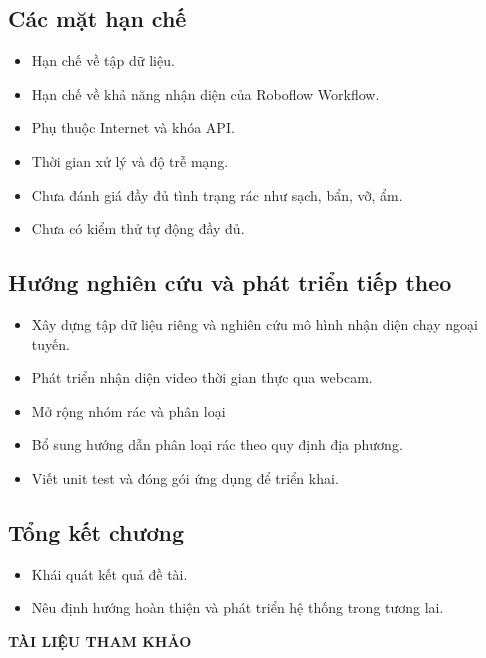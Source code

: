 \documentclass[a4paper,13pt]{extarticle}
\begin{document}
\subsection {Các mặt hạn chế}
\begin{itemize}
    \item Hạn chế về tập dữ liệu.
    \item Hạn chế về khả năng nhận diện của Roboflow Workflow.
    \item Phụ thuộc Internet và khóa API.
    \item Thời gian xử lý và độ trễ mạng.
    \item Chưa đánh giá đầy đủ tình trạng rác như sạch, bẩn, vỡ, ẩm.
    \item Chưa có kiểm thử tự động đầy đủ.
\end{itemize}

\subsection{ Hướng nghiên cứu và phát triển tiếp theo}
\begin{itemize}
    \item Xây dựng tập dữ liệu riêng và nghiên cứu mô hình nhận diện chạy ngoại tuyến.
    \item Phát triển nhận diện video thời gian thực qua webcam.
    \item Mở rộng nhóm rác và phân loại
    \item Bổ sung hướng dẫn phân loại rác theo quy định địa phương.
    \item Viết unit test và đóng gói ứng dụng để triển khai.
\end{itemize}

\subsection{ Tổng kết chương}
\begin{itemize}
    \item Khái quát kết quả đề tài.
    \item Nêu định hướng hoàn thiện và phát triển hệ thống trong tương lai.
\end{itemize}

\newpage

\begin{center}
    {\fontsize{16}{20}\selectfont \textbf{TÀI LIỆU THAM KHẢO}}\\[0.5cm]
\end{center}
\end{document}
